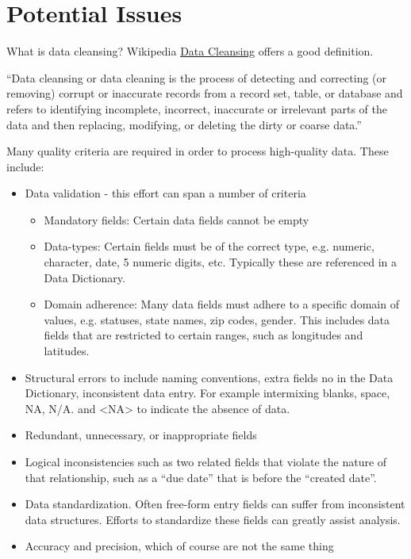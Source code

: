 \documentclass[12pt, titlepage]{article}
\begin{document}
\section{Potential Issues} \label{sec:issues}

What is data cleansing?  Wikipedia \href{https://en.wikipedia.org/wiki/Data_cleansing}{Data Cleansing} offers a good definition. 

``Data cleansing or data cleaning is the process of detecting and correcting (or removing) corrupt or inaccurate records from a record set, 
table, or database and refers to identifying incomplete, incorrect, inaccurate or irrelevant parts of the data 
and then replacing, modifying, or deleting the dirty or coarse data.''

Many quality criteria are required in order to process high-quality data. These include:

\begin{itemize}
	\item Data validation - this effort can span a number of criteria
	\begin{itemize}
		\item Mandatory fields: Certain data fields cannot be empty
		\item Data-types: Certain fields must be of the correct type, e.g. numeric, character, date, 5 numeric digits, etc. Typically these are referenced in a Data Dictionary.
		\item Domain adherence:  Many data fields must adhere to a specific domain of values, e.g. statuses, state names, zip codes, gender. This includes data
		fields that are restricted to certain ranges, such as longitudes and latitudes.
	\end{itemize}   
	\item Structural errors to include naming conventions, extra fields no in the Data Dictionary, inconsistent data entry.
	For example intermixing blanks, space, NA, N/A. and <NA> to indicate the absence of data.
	\item Redundant, unnecessary, or inappropriate fields
	\item Logical inconsistencies such as two related fields that violate the nature of that relationship, such as a ``due date'' that is before the ``created date''.
	\item Data standardization. Often free-form entry fields can suffer from inconsistent data structures. Efforts to standardize these fields can greatly assist analysis.
	\item Accuracy and precision, which of course are not the same thing 
\end{itemize}
\end{document}
